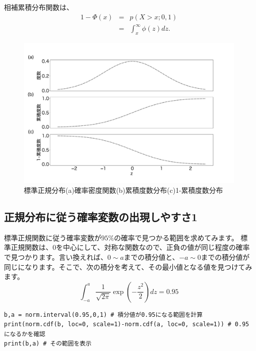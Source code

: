 相補累積分布関数は、
\begin{eqnarray}
    1-\Phi(x) &=& p(X>x; 0,1) \\
        &=& \int_{x}^{\infty} \phi(z)dz.
\end{eqnarray}


\begin{figure}
    \begin{center}
        \includegraphics[width=15cm]{./image/02_/standard_normal.pdf}
        \caption{標準正規分布(a)確率密度関数(b)累積度数分布(c)1-累積度数分布}
        \label{fig:standard_normal_distribution}

    \end{center}
\end{figure}
    

\subsection{正規分布に従う確率変数の出現しやすさ1}
標準正規関数に従う確率変数が$95\%$の確率で見つかる範囲を求めてみます。
標準正規関数は、0を中心にして、対称な関数なので、正負の値が同じ程度の確率で見つかります。言い換えれば、$0\sim a$までの積分値と、$-a\sim 0$までの積分値が同じになります。そこで、次の積分を考えて、その最小値となる値を見つけてみます。
\begin{equation}
\int_{-a}^{a} \frac{1}{\sqrt{2\pi}}\exp(-\frac{z^2}{2}) dz = 0.95
\end{equation}

\begin{lstlisting}
b,a = norm.interval(0.95,0,1) # 積分値が0.95になる範囲を計算
print(norm.cdf(b, loc=0, scale=1)-norm.cdf(a, loc=0, scale=1)) # 0.95になるかを確認
print(b,a) # その範囲を表示
\end{lstlisting}


